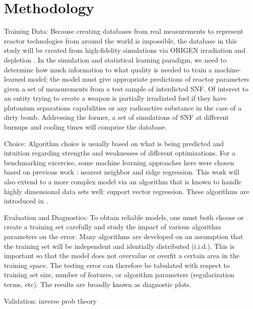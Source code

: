 \section{Methodology}
\label{sec:methodology}


Training Data: Because creating databases from real measurements to represent reactor
technologies from around the world is impossible, the database in this study
will be created from high-fidelity simulations via ORIGEN irradiation and
depletion . In the simulation and
statistical learning paradigm, we need to determine how much information to
what quality is needed to train a machine-learned model; the model must give
appropriate predictions of reactor parameters given a set of measurements from
a test sample of interdicted \gls{SNF}. Of interest to an entity trying to
create a weapon is partially irradiated fuel if they have plutonium separations
capabilities or any radioactive substance in the case of a dirty bomb.
Addressing the former, a set of simulations of \gls{SNF} at different burnups
and cooling times will comprise the database.

Choice: Algorithm choice is usually based on what is being predicted and intuition
regarding strengths and weaknesses of different optimizations.  For a
benchmarking excercise, some machine learning approaches here were chosen based
on previous work \cite{dayman_feasibility_2013}: nearest neighbor and ridge
regression. This work will also extend to a more complex model via an algorithm
that is known to handle highly dimensional data sets well: support vector
regression.  These algorithms are introduced in \label{sec:algs}.

Evaluation and Diagnostics: To obtain reliable models, one must both choose or create a training set
carefully and study the impact of various algorithm parameters on the error.
Many algorithms are developed on an assumption that the training set will be
independent and identially distributed (i.i.d.). This is important so that the
model does not overvalue or overfit a certain area in the training space. The
testing error can therefore be tabulated with respect to training set size,
number of features, or algorithm parameters (regularization terms, etc). The
results are broadly known as diagnostic plots. 

Validation: inverse prob theory

